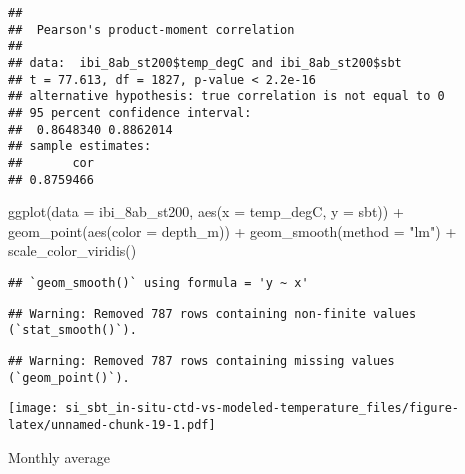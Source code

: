 \documentclass[
]{article}
\newenvironment{Shaded}{\begin{snugshade}}{\end{snugshade}}
\newcommand{\AttributeTok}[1]{\textcolor[rgb]{0.77,0.63,0.00}{#1}}
\newcommand{\FunctionTok}[1]{\textcolor[rgb]{0.00,0.00,0.00}{#1}}
\newcommand{\NormalTok}[1]{#1}
\newcommand{\SpecialCharTok}[1]{\textcolor[rgb]{0.00,0.00,0.00}{#1}}
\newcommand{\StringTok}[1]{\textcolor[rgb]{0.31,0.60,0.02}{#1}}
\begin{document}
\begin{verbatim}
## 
##  Pearson's product-moment correlation
## 
## data:  ibi_8ab_st200$temp_degC and ibi_8ab_st200$sbt
## t = 77.613, df = 1827, p-value < 2.2e-16
## alternative hypothesis: true correlation is not equal to 0
## 95 percent confidence interval:
##  0.8648340 0.8862014
## sample estimates:
##       cor 
## 0.8759466
\end{verbatim}

\begin{Shaded}
\begin{Highlighting}[]
\FunctionTok{ggplot}\NormalTok{(}\AttributeTok{data =}\NormalTok{ ibi\_8ab\_st200, }\FunctionTok{aes}\NormalTok{(}\AttributeTok{x =}\NormalTok{ temp\_degC, }\AttributeTok{y =}\NormalTok{ sbt)) }\SpecialCharTok{+} \FunctionTok{geom\_point}\NormalTok{(}\FunctionTok{aes}\NormalTok{(}\AttributeTok{color =}\NormalTok{ depth\_m)) }\SpecialCharTok{+} \FunctionTok{geom\_smooth}\NormalTok{(}\AttributeTok{method =} \StringTok{"lm"}\NormalTok{) }\SpecialCharTok{+} \FunctionTok{scale\_color\_viridis}\NormalTok{()}
\end{Highlighting}
\end{Shaded}

\begin{verbatim}
## `geom_smooth()` using formula = 'y ~ x'
\end{verbatim}

\begin{verbatim}
## Warning: Removed 787 rows containing non-finite values (`stat_smooth()`).
\end{verbatim}

\begin{verbatim}
## Warning: Removed 787 rows containing missing values (`geom_point()`).
\end{verbatim}

\texttt{[image: si\_sbt\_in-situ-ctd-vs-modeled-temperature\_files/figure-latex/unnamed-chunk-19-1.pdf]}

Monthly average
\end{document}
